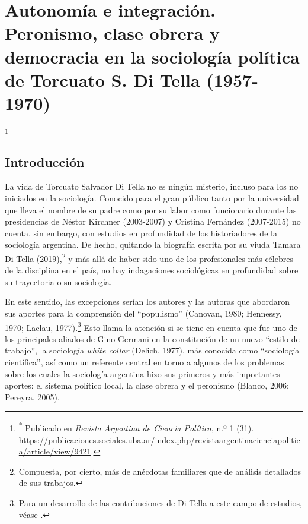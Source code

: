 \chapter{Autonomía e integración. Peronismo, clase obrera y democracia en la sociología política de Torcuato S. Di Tella (1957-1970)}

\footnote{\textsuperscript{*} Publicado en \emph{Revista Argentina de Ciencia Política}, n.º 1 (31). \url{https://publicaciones.sociales.uba.ar/index.php/revistaargentinacienciapolitica/article/view/9421}.}

\section{Introducción}

La vida de Torcuato Salvador Di Tella no es ningún misterio, incluso para los no iniciados en la sociología. Conocido para el gran público tanto por la universidad que lleva el nombre de su padre como por su labor como funcionario durante las presidencias de Néstor Kirchner (2003-2007) y Cristina Fernández (2007-2015) no cuenta, sin embargo, con estudios en profundidad de los historiadores de la sociología argentina. De hecho, quitando la biografía escrita por su viuda Tamara Di Tella (2019),\footnote{Compuesta, por cierto, más de anécdotas familiares que de análisis detallados de sus trabajos.} y más allá de haber sido uno de los profesionales más célebres de la disciplina en el país, no hay indagaciones sociológicas en profundidad sobre su trayectoria o su sociología.

En este sentido, las excepciones serían los autores y las autoras que abordaron sus aportes para la comprensión del \enquote{populismo} \parencite{1531-QUATTROCCHIWOISSON1997}(Canovan, 1980; Hennessy, 1970; Laclau, 1977).\footnote{Para un desarrollo de las contribuciones de Di Tella a este campo de estudios, véase \textcite[234-242]{278-AMARAL2018}.} Esto llama la atención si se tiene en cuenta que fue uno de los principales aliados de Gino Germani en la constitución de un nuevo \enquote{estilo de trabajo}, la sociología \emph{white collar} (Delich, 1977), más conocida como \enquote{sociología científica}, así como un referente central en torno a algunos de los problemas sobre los cuales la sociología argentina hizo sus primeros y más importantes aportes: el sistema político local, la clase obrera y el peronismo \parencite{1511-SARLO2001,1548-NEIBURG1998}(Blanco, 2006; Pereyra, 2005).

